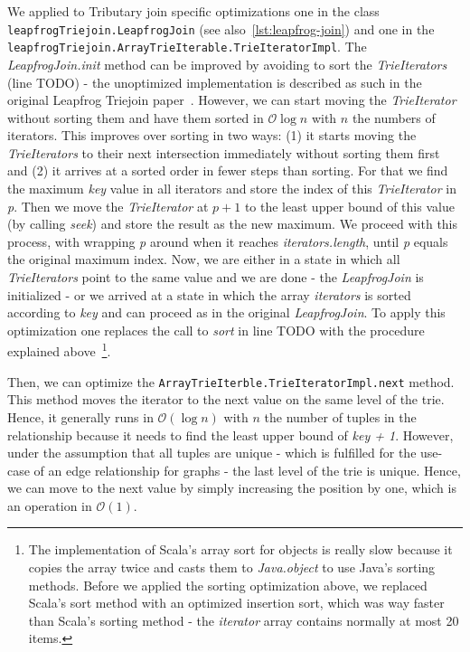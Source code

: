We applied to Tributary join specific optimizations one in the class \texttt{leapfrogTriejoin.LeapfrogJoin} (see also~\cref{lst:leapfrog-join}) and one
in the \texttt{leapfrogTriejoin.ArrayTrieIterable.TrieIteratorImpl}.
The \textit{LeapfrogJoin.init} method can be improved by avoiding to sort the \textit{TrieIterators} (line TODO)  %
- the unoptimized implementation is described as such in the original Leapfrog Triejoin paper~\cite{leapfrog}.
However, we can start moving the \textit{TrieIterator} without sorting them and have them sorted in $\mathcal{O} \log n$ with $n$ the numbers of iterators.
This improves over sorting in two ways: (1) it starts moving the \textit{TrieIterators} to their next intersection immediately without sorting them first and
(2) it arrives at a sorted order in fewer steps than sorting.
For that we find the maximum \textit{key} value in all iterators and store the index of this \textit{TrieIterator} in \textit{p}.
Then we move the \textit{TrieIterator} at $p + 1$ to the least upper bound of this value (by calling \textit{seek}) and store the result as the new maximum.
We proceed with this process, with wrapping \textit{p} around when it reaches \textit{iterators.length}, until \textit{p} equals the original maximum index.
Now, we are either in a state in which all \textit{TrieIterators} point to the same value and we are done - the \textit{LeapfrogJoin} is initialized -
or we arrived at a state in which the array \textit{iterators} is sorted according to \textit{key} and can proceed as in the original \textit{LeapfrogJoin}.
To apply this optimization one replaces the call to \textit{sort} in line TODO with the procedure explained above~\footnote{The implementation of Scala's array sort for objects is really
slow because it copies the array twice and casts them to \textit{Java.object} to use Java's sorting methods. Before we applied the sorting optimization above, we replaced Scala's sort
method with an optimized insertion sort, which was way faster than Scala's sorting method - the \textit{iterator} array contains normally at most 20 items.}.

Then, we can optimize the \texttt{ArrayTrieIterble.TrieIteratorImpl.next} method.
This method moves the iterator to the next value on the same level of the trie.
Hence, it generally runs in $\mathcal{O} (\log n)$ with $n$ the number of tuples in the relationship because it needs to find the least upper bound of \textit{key + 1}.
However, under the assumption that all tuples are unique - which is fulfilled for the use-case of an edge relationship for graphs - the last level of the trie
is unique.
Hence, we can move to the next value by simply increasing the position by one, which is an operation in $\mathcal{O} (1)$.

